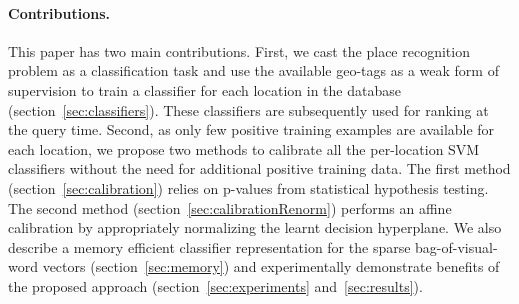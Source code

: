 \paragraph{Contributions.} 
  This paper has two main contributions. First, we cast the place recognition problem as a classification task and use the available geo-tags \textcolor{petr}{as a weak form of supervision} to train a classifier for each location in the database (section~\ref{sec:classifiers}). 
  \textcolor{petr}{
    These classifiers are subsequently used for ranking at the query time.
  } 
  Second, as only few positive training examples are available for each location, we propose two methods to calibrate all the per-location SVM classifiers without the need for additional positive training data. The first method (section~\ref{sec:calibration}) relies on p-values from statistical hypothesis testing. The second method (section~\ref{sec:calibrationRenorm}) performs an affine calibration by appropriately normalizing the learnt decision hyperplane. 
  We also describe a memory efficient classifier representation for the sparse bag-of-visual-word vectors (section~\ref{sec:memory}) and  experimentally demonstrate benefits of the proposed approach (section~\ref{sec:experiments} and~\ref{sec:results}). 


